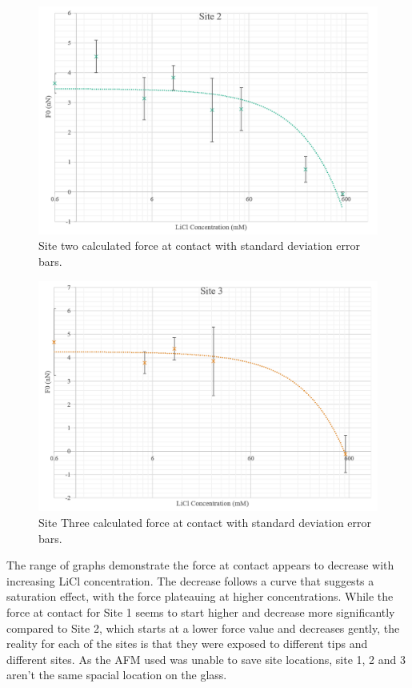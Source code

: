 \begin{figure}
    \centering
    \includegraphics[width=1\linewidth]{chapter5/Overall/Site 2.png}
    \caption{Site two calculated force at contact with standard deviation error bars.}
    \label{fig:site2cont}
\end{figure}

\begin{figure}
    \centering
    \includegraphics[width=1\linewidth]{chapter5/Overall/Site 3.png}
    \caption{Site Three calculated force at contact with standard deviation error bars.}
    \label{fig:site3cont}
\end{figure}

The range of graphs demonstrate the force at contact appears to decrease with increasing LiCl concentration. The decrease follows a curve that suggests a saturation effect, with the force plateauing at higher concentrations. While the force at contact for Site 1 seems to start higher and decrease more significantly compared to Site 2, which starts at a lower force value and decreases gently, the reality for each of the sites is that they were exposed to different tips and different sites. As the AFM used was unable to save site locations, site 1, 2 and 3 aren't the same spacial location on the glass.

